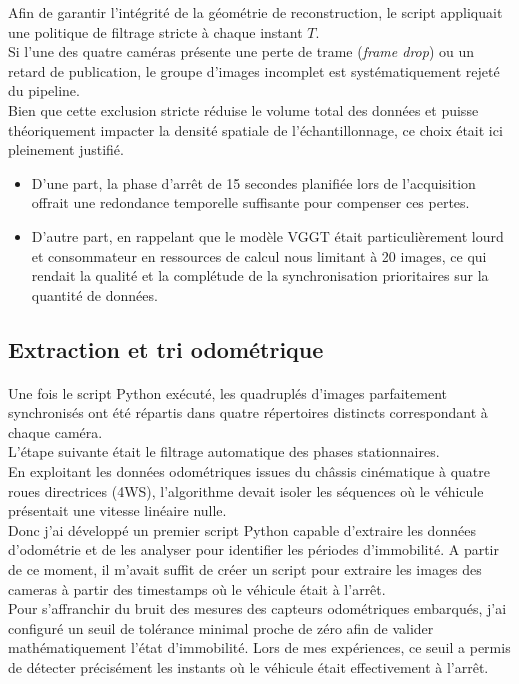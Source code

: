 \documentclass[12pt,a4paper,oneside]{report}
\begin{document}
\hspace*{.3cm}Afin de garantir l'intégrité de la géométrie de reconstruction, le script appliquait une politique de filtrage stricte à chaque instant $T$.\\
\hspace*{0.3cm} Si l'une des quatre caméras présente une perte de trame (\textit{frame drop}) ou un retard de publication, le groupe d'images incomplet est systématiquement rejeté du pipeline.\\
\hspace*{.3cm} Bien que cette exclusion stricte réduise le volume total des données et puisse théoriquement impacter la densité spatiale de l'échantillonnage, ce choix était ici pleinement justifié.
\begin{itemize}[itemsep=0.5em]
	\item D'une part, la phase d'arrêt de 15 secondes planifiée lors de l'acquisition offrait une redondance temporelle suffisante pour compenser ces pertes.
	\item D'autre part, en rappelant que le modèle VGGT était particulièrement lourd et consommateur en ressources de calcul nous limitant à 20 images, ce qui rendait la qualité et la complétude de la synchronisation prioritaires sur la quantité de données.
\end{itemize}

\newpage

\subsection{Extraction et tri odométrique }

\paragraph{}
Une fois le script Python exécuté, les quadruplés d'images parfaitement synchronisés ont été répartis dans quatre répertoires distincts correspondant à chaque caméra.\\
L'étape suivante était le filtrage automatique des phases stationnaires.\\

\hspace*{.5cm} En exploitant les données odométriques issues du châssis cinématique à quatre roues directrices (4WS), l'algorithme devait isoler les séquences où le véhicule présentait une vitesse linéaire nulle.\\
Donc j'ai développé un premier script Python capable d'extraire les données d'odométrie et de les analyser pour identifier les périodes d'immobilité. A partir de ce moment, il m'avait suffit de créer un script pour extraire les images des cameras à partir des timestamps où le véhicule était à l'arrêt.\\
 \hspace*{.5cm} Pour s'affranchir du bruit des mesures des capteurs odométriques embarqués, j'ai configuré un seuil de tolérance minimal proche de zéro afin de valider mathématiquement l'état d'immobilité. Lors de mes expériences, ce seuil a permis de détecter précisément les instants où le véhicule était effectivement à l'arrêt.\\
\end{document}
